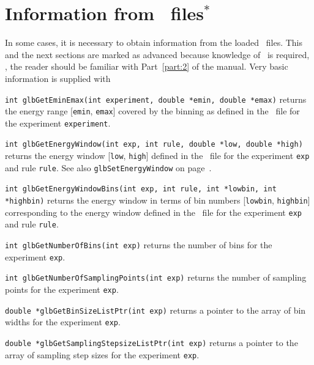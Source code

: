 \section{Information from \AEDL\ files$^*$}
\label{sec:aedl_names}

In some cases, it is necessary to obtain information from the loaded \AEDL\
files. This and the next sections are marked as advanced because knowledge of \AEDL\ is
required, \ie,  the reader should be familiar with Part~\ref{part:2} of the manual.
%
Very basic information is supplied with
\begin{function}
{\tt int glbGetEminEmax(int experiment, double *emin, double *emax)} returns the
energy range [{\tt emin}, {\tt emax}] covered by the binning as defined in the \AEDL\ file for the experiment
{\tt experiment}.
\end{function}
\begin{function}
 \label{glbGetEnergyWindow}
{\tt int glbGetEnergyWindow(int exp, int rule, double *low, double *high)} returns the
energy window [{\tt low}, {\tt high}] defined in the \AEDL\ file for the experiment
{\tt exp} and rule {\tt rule}. See also {\tt glbSetEnergyWindow} on page~\pageref{glbSetEnergyWindow}.
\end{function}
\begin{function}
{\tt int glbGetEnergyWindowBins(int exp, int rule, int *lowbin, int *highbin)} returns the
energy window in terms of bin numbers [{\tt lowbin}, {\tt highbin}] corresponding to the energy window defined in the \AEDL\ file for the experiment {\tt exp} and rule {\tt rule}.
\end{function}
\begin{function}
{\tt int glbGetNumberOfBins(int exp)} returns the number of bins for the experiment {\tt exp}.
\end{function}
\begin{function}
{\tt int glbGetNumberOfSamplingPoints(int exp)} returns the number of sampling points for the experiment {\tt exp}.
\end{function}
\begin{function}
{\tt double *glbGetBinSizeListPtr(int exp)} returns a pointer to the array of bin widths
for the experiment {\tt exp}.
\end{function}
\begin{function}
{\tt double *glbGetSamplingStepsizeListPtr(int exp)} returns a pointer to the array of
sampling step sizes for the experiment {\tt exp}.
\end{function}

